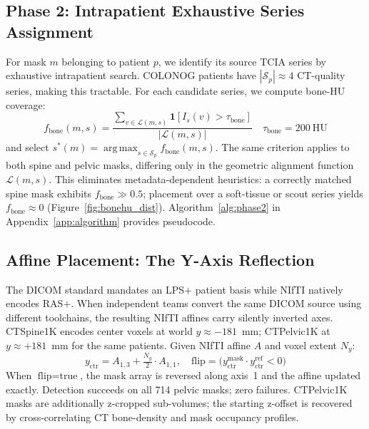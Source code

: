 \documentclass[pmlr]{jmlr}
\DeclareMathOperator*{\argmax}{arg\,max}
\begin{document}
\subsection{Phase 2: Intrapatient Exhaustive Series Assignment}
\label{sec:phase2}

For mask $m$ belonging to patient $p$, we identify its source TCIA
series by exhaustive intrapatient search.
COLONOG patients have $|\mathcal{S}_p| \approx 4$ CT-quality series,
making this tractable.
For each candidate series, we compute bone-HU coverage:
\begin{equation}
f_\text{bone}(m, s) =
  \frac{\sum_{v \in \mathcal{L}(m,s)}
        \mathbf{1}[I_s(v) > \tau_\text{bone}]}{|\mathcal{L}(m,s)|}
\quad \tau_\text{bone} = 200~\text{HU}
\label{eq:bonehu}
\end{equation}
and select $s^*(m) = \argmax_{s \in \mathcal{S}_p} f_\text{bone}(m,s)$.
The same criterion applies to both spine and pelvic masks, differing
only in the geometric alignment function $\mathcal{L}(m,s)$.
This eliminates metadata-dependent heuristics: a correctly matched
spine mask exhibits $f_\text{bone} \gg 0.5$; placement over a
soft-tissue or scout series yields $f_\text{bone} \approx 0$
(Figure~\ref{fig:bonehu_dist}).
Algorithm~\ref{alg:phase2} in Appendix~\ref{app:algorithm} provides
pseudocode.

\subsection{Affine Placement: The Y-Axis Reflection}
\label{sec:placement}

The DICOM standard mandates an LPS$+$ patient basis while NIfTI
natively encodes RAS$+$.
When independent teams convert the same DICOM source using different
toolchains, the resulting NIfTI affines carry silently inverted axes.
CTSpine1K encodes center voxels at world $y \approx -181$~mm;
CTPelvic1K at $y \approx +181$~mm for the same patients.
Given NIfTI affine $A$ and voxel extent $N_y$:
\begin{equation}
y_\text{ctr} = A_{1,3} + \tfrac{N_y}{2} \cdot A_{1,1},
\quad
\text{flip} = \bigl(y_\text{ctr}^\text{mask} \cdot
  y_\text{ctr}^\text{ref} < 0\bigr)
\end{equation}
When $\text{flip}=\text{true}$, the mask array is reversed along
axis~1 and the affine updated exactly.
Detection succeeds on all 714 pelvic masks; zero failures.
CTPelvic1K masks are additionally z-cropped sub-volumes; the
starting z-offset is recovered by cross-correlating CT bone-density
and mask occupancy profiles.
\end{document}
